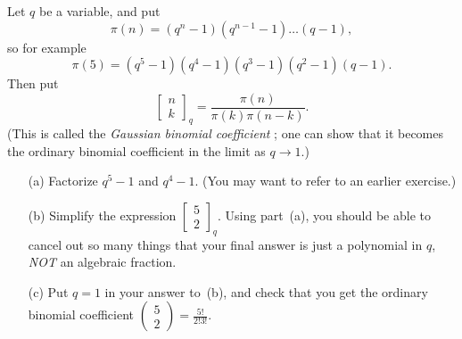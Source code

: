 \documentclass[a4paper]{book}
\newcommand{\RED}[1]{{\color{red}#1}}
\newcommand{\PURPLE}[1]{{\color{purple}#1}}
\newcommand{\bbm}       {\begin{bmatrix}}
\newcommand{\ebm}       {\end{bmatrix}}
\newcommand{\xra}       {\xrightarrow}
\renewcommand{\:}{\colon}
\newcommand{\mathworld}[1]{}
\newcommand{\EMPH}[1]{\RED{\emph{#1}}}
\newcommand{\DEFN}[1]{\PURPLE{\emph{#1}}}
\theoremstyle{definition}
\newenvironment{starex}{
 \renewcommand{\thetheorem}{\arabic{chapter}.\arabic{section}.\arabic{theorem}${}^*$}
 \exercise
}{\endexercise}
\begin{document}
\begin{starex}
 Let $q$ be a variable, and put
 \[ \pi(n) = (q^n-1)(q^{n-1}-1)\ldots(q-1), \]
 so for example 
 \[ \pi(5)=(q^5-1)(q^4-1)(q^3-1)(q^2-1)(q-1). \]
 Then put
 \[ \bbm n \\ k\ebm_q = 
     \frac{\pi(n)}{\pi(k)\pi(n-k)}.
 \]
 (This is called the \DEFN{Gaussian binomial coefficient}
 \mathworld{q-BinomialCoefficient}; one can show that it becomes the
 ordinary binomial coefficient in the limit as $q\xra{}1$.)
 
 \begin{itemize}
  \item[(a)] Factorize $q^5-1$ and $q^4-1$.  (You may want to refer to
   an earlier exercise.)
  \item[(b)] Simplify the expression
   $\bbm 5\\ 2\ebm_q$.  Using part~(a),
   you should be able to cancel out so many things that your final
   answer is just a polynomial in $q$, \EMPH{NOT} an algebraic
   fraction. 
  \item[(c)] Put $q=1$ in your answer to~(b), and check that you get
   the ordinary binomial coefficient
   $\begin{pmatrix} 5\\2\end{pmatrix}=\frac{5!}{2!3!}$.
 \end{itemize}
\end{starex}
\end{document}
